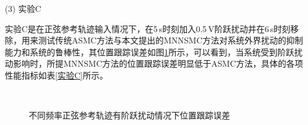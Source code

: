 (3) 实验C

实验C是在正弦参考轨迹输入情况下，在5\,s时刻加入0.5\,V阶跃扰动并在6\,s时刻移除，用来测试传统ASMC方法与本文提出的MNNSMC方法对系统外界扰动的抑制能力和系统的鲁棒性，其位置跟踪误差如图\ref{不同频率正弦参考轨迹有阶跃扰动情况下位置跟踪误差}所示，可以看到，当系统受到阶跃扰动影响时，所提MNNSMC方法的位置跟踪误差明显低于ASMC方法，具体的各项性能指标如表\ref{实验C}所示。
\begin{figure}[H]\centering
	\\
	\caption{不同频率正弦参考轨迹有阶跃扰动情况下位置跟踪误差}\label{不同频率正弦参考轨迹有阶跃扰动情况下位置跟踪误差}
\end{figure}

